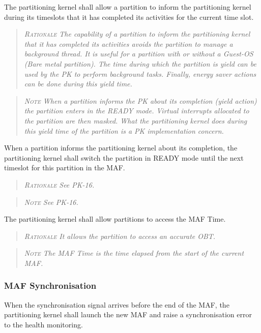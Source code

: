 The partitioning kernel shall allow a partition to inform the partitioning kernel during its timeslots that it has completed its activities for the current time slot.
\begin{quote}\it
\textsc{Rationale}
The capability of a partition to inform the partitioning kernel that it has completed its activities avoids the partition to manage a background thread. It is useful for a partition with or without a Guest-OS (Bare metal partition). The time during which the partition is yield can be used by the PK to perform background tasks. Finally, energy saver actions can be done during this yield time.
\end{quote}
\begin{quote}\it
\textsc{Note}
When a partition informs the PK about its completion (yield action) the partition enters in the READY mode. Virtual interrupts allocated to the partition are then masked. What the partitioning kernel does during this yield time of the partition is a PK implementation concern.
\end{quote}

When a partition informs the partitioning kernel about its completion, the partitioning kernel shall switch the partition in READY mode until the next timeslot for this partition in the MAF.
\begin{quote}\it
\textsc{Rationale}
See PK-16.
\end{quote}
\begin{quote}\it
\textsc{Note}
See PK-16.
\end{quote}

The partitioning kernel shall allow partitions to access the MAF Time.
\begin{quote}\it
\textsc{Rationale}
It allows the partition to access an accurate OBT.
\end{quote}
\begin{quote}\it
\textsc{Note}
The MAF Time is the time elapsed from the start of the current MAF.
\end{quote}

\subsubsection*{MAF Synchronisation}

When the synchronisation signal arrives before the end of the MAF, the partitioning kernel shall launch the new MAF and raise a synchronisation error to the health monitoring.

